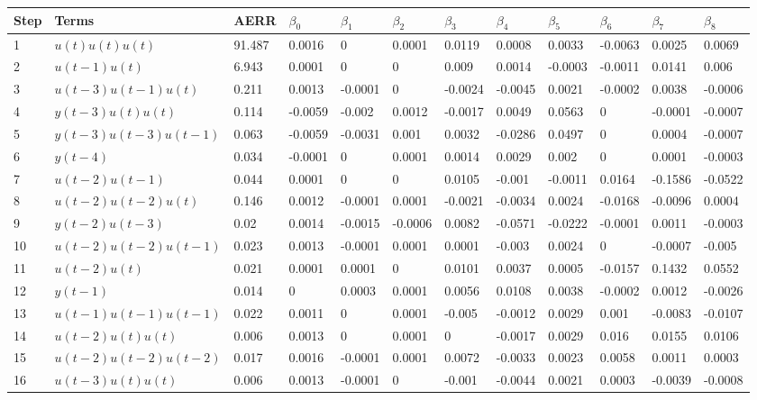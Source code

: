 \begin{tabular}{llllllllllll}
Step & Terms & AERR & $\beta_{0}$ & $\beta_{1}$ & $\beta_{2}$ & $\beta_{3}$ & $\beta_{4}$ & $\beta_{5}$ & $\beta_{6}$ & $\beta_{7}$ & $\beta_{8}$ \\ 
\hline 
1 & $u(t)u(t)u(t)$ & 91.487 & 0.0016 & 0 & 0.0001 & 0.0119 & 0.0008 & 0.0033 & -0.0063 & 0.0025 & 0.0069 \\ 
2 & $u(t-1)u(t)$ & 6.943 & 0.0001 & 0 & 0 & 0.009 & 0.0014 & -0.0003 & -0.0011 & 0.0141 & 0.006 \\ 
3 & $u(t-3)u(t-1)u(t)$ & 0.211 & 0.0013 & -0.0001 & 0 & -0.0024 & -0.0045 & 0.0021 & -0.0002 & 0.0038 & -0.0006 \\ 
4 & $y(t-3)u(t)u(t)$ & 0.114 & -0.0059 & -0.002 & 0.0012 & -0.0017 & 0.0049 & 0.0563 & 0 & -0.0001 & -0.0007 \\ 
5 & $y(t-3)u(t-3)u(t-1)$ & 0.063 & -0.0059 & -0.0031 & 0.001 & 0.0032 & -0.0286 & 0.0497 & 0 & 0.0004 & -0.0007 \\ 
6 & $y(t-4)$ & 0.034 & -0.0001 & 0 & 0.0001 & 0.0014 & 0.0029 & 0.002 & 0 & 0.0001 & -0.0003 \\ 
7 & $u(t-2)u(t-1)$ & 0.044 & 0.0001 & 0 & 0 & 0.0105 & -0.001 & -0.0011 & 0.0164 & -0.1586 & -0.0522 \\ 
8 & $u(t-2)u(t-2)u(t)$ & 0.146 & 0.0012 & -0.0001 & 0.0001 & -0.0021 & -0.0034 & 0.0024 & -0.0168 & -0.0096 & 0.0004 \\ 
9 & $y(t-2)u(t-3)$ & 0.02 & 0.0014 & -0.0015 & -0.0006 & 0.0082 & -0.0571 & -0.0222 & -0.0001 & 0.0011 & -0.0003 \\ 
10 & $u(t-2)u(t-2)u(t-1)$ & 0.023 & 0.0013 & -0.0001 & 0.0001 & 0.0001 & -0.003 & 0.0024 & 0 & -0.0007 & -0.005 \\ 
11 & $u(t-2)u(t)$ & 0.021 & 0.0001 & 0.0001 & 0 & 0.0101 & 0.0037 & 0.0005 & -0.0157 & 0.1432 & 0.0552 \\ 
12 & $y(t-1)$ & 0.014 & 0 & 0.0003 & 0.0001 & 0.0056 & 0.0108 & 0.0038 & -0.0002 & 0.0012 & -0.0026 \\ 
13 & $u(t-1)u(t-1)u(t-1)$ & 0.022 & 0.0011 & 0 & 0.0001 & -0.005 & -0.0012 & 0.0029 & 0.001 & -0.0083 & -0.0107 \\ 
14 & $u(t-2)u(t)u(t)$ & 0.006 & 0.0013 & 0 & 0.0001 & 0 & -0.0017 & 0.0029 & 0.016 & 0.0155 & 0.0106 \\ 
15 & $u(t-2)u(t-2)u(t-2)$ & 0.017 & 0.0016 & -0.0001 & 0.0001 & 0.0072 & -0.0033 & 0.0023 & 0.0058 & 0.0011 & 0.0003 \\ 
16 & $u(t-3)u(t)u(t)$ & 0.006 & 0.0013 & -0.0001 & 0 & -0.001 & -0.0044 & 0.0021 & 0.0003 & -0.0039 & -0.0008 \\ 
\hline 
\end{tabular}